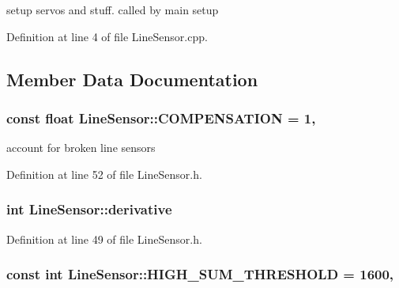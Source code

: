 setup servos and stuff. called by main setup 



Definition at line 4 of file Line\-Sensor.\-cpp.



\subsection{Member Data Documentation}
\hypertarget{classLineSensor_affb177c49a3381f380b6ff7dd298297f}{
\subsubsection[{C\-O\-M\-P\-E\-N\-S\-A\-T\-I\-O\-N}]{\setlength{\rightskip}{0pt plus 5cm}const float Line\-Sensor\-::\-C\-O\-M\-P\-E\-N\-S\-A\-T\-I\-O\-N = 1\hspace{0.3cm}{\ttfamily [static]}, {\ttfamily [private]}}}\label{classLineSensor_affb177c49a3381f380b6ff7dd298297f}


account for broken line sensors 



Definition at line 52 of file Line\-Sensor.\-h.

\hypertarget{classLineSensor_aa5bd7119b2332eab8b6c850f8fa3d558}{
\subsubsection[{derivative}]{\setlength{\rightskip}{0pt plus 5cm}int Line\-Sensor\-::derivative\hspace{0.3cm}{\ttfamily [private]}}}\label{classLineSensor_aa5bd7119b2332eab8b6c850f8fa3d558}


Definition at line 49 of file Line\-Sensor.\-h.

\hypertarget{classLineSensor_a3e7f65abc054f54cb74f8aa3eb552e89}{
\subsubsection[{H\-I\-G\-H\-\_\-\-S\-U\-M\-\_\-\-T\-H\-R\-E\-S\-H\-O\-L\-D}]{\setlength{\rightskip}{0pt plus 5cm}const int Line\-Sensor\-::\-H\-I\-G\-H\-\_\-\-S\-U\-M\-\_\-\-T\-H\-R\-E\-S\-H\-O\-L\-D = 1600\hspace{0.3cm}{\ttfamily [static]}, {\ttfamily [private]}}}\label{classLineSensor_a3e7f65abc054f54cb74f8aa3eb552e89}


